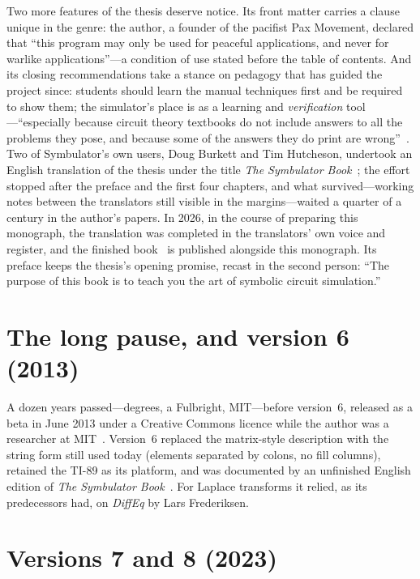 \documentclass[11pt,oneside]{report}
\begin{document}
Two more features of the thesis deserve notice. Its front matter
carries a clause unique in the genre: the author, a founder of the
pacifist Pax Movement, declared that ``this program may only be used
for peaceful applications, and never for warlike applications''---a
condition of use stated before the table of contents. And its
closing recommendations take a stance on pedagogy that has guided
the project since: students should learn the manual techniques
first and be required to show them; the simulator's place is as a
learning and \emph{verification} tool---``especially because circuit
theory textbooks do not include answers to all the problems they
pose, and because some of the answers they do print are
wrong''~\cite[Recs.]{thesis2000}. Two of Symbulator's own users,
Doug Burkett and Tim Hutcheson, undertook an English translation of
the thesis under the title \emph{The Symbulator
Book}~\cite[Acks.]{thesis2000}; the effort stopped after the
preface and the first four chapters, and what survived---working
notes between the translators still visible in the margins---waited
a quarter of a century in the author's papers. In 2026, in the
course of preparing this monograph, the translation was completed
in the translators' own voice and register, and the finished
book~\cite{book2026} is published alongside this monograph. Its
preface keeps the thesis's opening promise, recast in the second
person: ``The purpose of this book is to teach you the art of
symbolic circuit simulation.''

\section{The long pause, and version 6 (2013)}

A dozen years passed---degrees, a Fulbright, MIT---before version~6,
released as a beta in June 2013 under a Creative Commons licence while
the author was a researcher at MIT~\cite{book2014}. Version~6 replaced
the matrix-style description with the string form still used today
(elements separated by colons, no fill columns), retained the TI-89 as
its platform, and was documented by an unfinished English edition of
\emph{The Symbulator Book}~\cite{book2014}. For Laplace transforms it
relied, as its predecessors had, on \emph{DiffEq} by Lars Frederiksen.

\section{Versions 7 and 8 (2023)}
\end{document}
